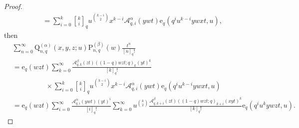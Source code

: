 \documentclass[12pt]{article}
\newcommand{\qbinom}{\genfrac{[}{]}{0pt}{}}
\newcommand{\e}{\mathrm{e}}
\newcommand{\A}{\mathcal{A}}
\newcommand{\p}{\mathrm{P}}
\newcommand{\q}{\mathrm{Q}}
\begin{document}
\begin{proof}
\begin{align*}
    &=\sum_{i=0}^{k}\qbinom{k}{i}_{q}u^{\binom{k-i}{2}}x^{k-i}\A_{q,i}^{\alpha}(ywt)\e_{q}(q^{i}u^{k-i}ywxt,u),
\end{align*}
then
\begin{align*}
    &\sum_{n=0}^{\infty}\q_{n,q}^{(\alpha)}(x,y,z;u)\p_{n,q}^{(\beta)}(w)\frac{t^n}{[n]_{q}!}\\
    &=\e_{q}(wzt)\sum_{k=0}^{\infty}\frac{\A_{q,k}^{\beta}(zt)((1-q)wzt;q)_{k}(yt)^k}{[k]_{q}!}\\
    &\hspace{2cm}\times\sum_{i=0}^{k}\qbinom{k}{i}_{q}u^{\binom{k-i}{2}}x^{k-i}\A_{q,i}^{\alpha}(ywt)\e_{q}(q^{i}u^{k-i}ywxt,u)\\
    &=\e_{q}(wzt)\sum_{i=0}^{\infty}\frac{\A_{q,i}^{\alpha}(ywt)(yt)^i}{[i]_{q}!}\sum_{k=0}^{\infty}u^{\binom{k}{2}}\frac{\A_{q,k+i}^{\beta}(zt)((1-q)wzt;q)_{k+i}(xyt)^k}{[k]_{q}!}\e_{q}(q^{i}u^{k}ywzt,u).
\end{align*}

\end{proof}
\end{document}
